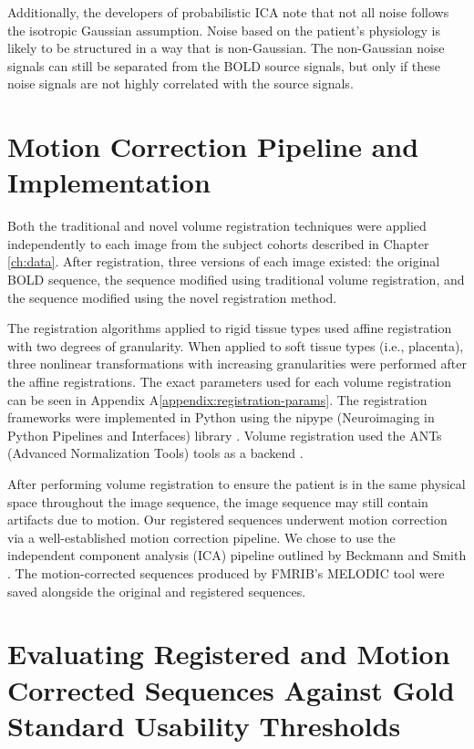 {Additionally, the developers of probabilistic ICA note that not all noise follows the isotropic Gaussian assumption. Noise based on the patient's physiology is likely to be structured in a way that is non-Gaussian. The non-Gaussian noise signals can still be separated from the BOLD source signals, but only if these noise signals are not highly correlated with the source signals.

\section{Motion Correction Pipeline and Implementation}

Both the traditional and novel volume registration techniques were applied independently to each image from the subject cohorts described in Chapter \ref{ch:data}. After registration, three versions of each image existed: the original BOLD sequence, the sequence modified using traditional volume registration, and the sequence modified using the novel registration method.

The registration algorithms applied to rigid tissue types used affine registration with two degrees of granularity. When applied to soft tissue types (i.e., placenta),  three nonlinear transformations with increasing granularities were performed after the affine registrations. The exact parameters used for each volume registration can be seen in Appendix A\ref{appendix:registration-params}. The registration frameworks were implemented in Python using the nipype (Neuroimaging in Python Pipelines and Interfaces) library \cite{Gorgolewski2011}. Volume registration used the ANTs (Advanced Normalization Tools) tools as a backend \cite{Avants2014}.

After performing volume registration to ensure the patient is in the same physical space throughout the image sequence, the image sequence may still contain artifacts due to motion. Our registered sequences underwent motion correction via a well-established motion correction pipeline. We chose to use the independent component analysis (ICA) pipeline outlined by Beckmann and Smith \cite{Beckmann2004}. The motion-corrected sequences produced by FMRIB's MELODIC tool were saved alongside the original and registered sequences.  

\section{Evaluating Registered and Motion Corrected Sequences Against Gold Standard Usability Thresholds}

}
